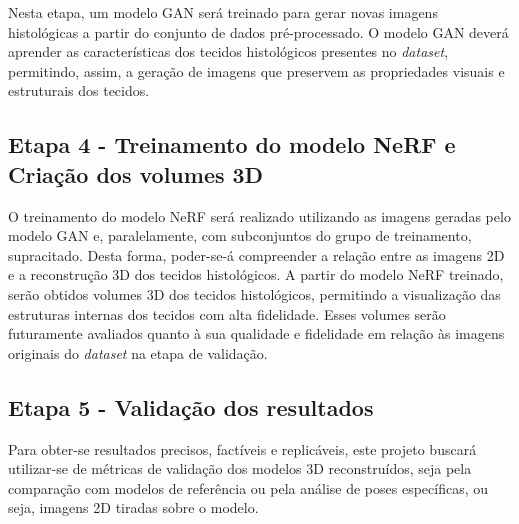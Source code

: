 Nesta etapa, um modelo GAN será treinado para gerar novas imagens histológicas a partir do conjunto de dados pré-processado. O modelo GAN deverá aprender as características dos tecidos histológicos presentes no \textit{dataset}, permitindo, assim, a geração de imagens que preservem as propriedades visuais e estruturais dos tecidos. 

\subsection{Etapa 4 - Treinamento do modelo NeRF e Criação dos volumes 3D}

O treinamento do modelo NeRF será realizado utilizando as imagens geradas pelo modelo GAN e, paralelamente, com subconjuntos do grupo de treinamento, supracitado. Desta forma, poder-se-á compreender a relação entre as imagens 2D e a reconstrução 3D dos tecidos histológicos. %
A partir do modelo NeRF treinado, serão obtidos volumes 3D dos tecidos histológicos, permitindo a visualização das estruturas internas dos tecidos com alta fidelidade. Esses volumes serão futuramente avaliados quanto à sua qualidade e fidelidade em relação às imagens originais do \textit{dataset} na etapa de validação. 

\subsection{Etapa 5 - Validação dos resultados}

Para obter-se resultados precisos, factíveis e replicáveis, este projeto buscará utilizar-se de métricas de validação dos modelos 3D reconstruídos, seja pela comparação com modelos de referência ou pela análise de poses específicas, ou seja, imagens 2D tiradas sobre o modelo.

